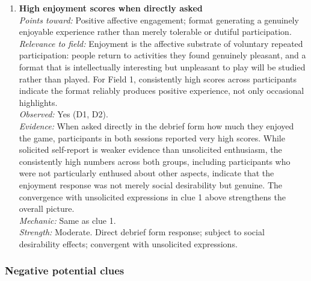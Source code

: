 \documentclass[12pt]{article}
\begin{document}
\begin{enumerate}
\item \textbf{High enjoyment scores when directly asked}\\
\textit{Points toward:} Positive affective engagement; format generating a genuinely enjoyable experience rather than merely tolerable or dutiful participation.\\
\textit{Relevance to field:} Enjoyment is the affective substrate of voluntary repeated participation: people return to activities they found genuinely pleasant, and a format that is intellectually interesting but unpleasant to play will be studied rather than played. For Field 1, consistently high scores across participants indicate the format reliably produces positive experience, not only occasional highlights.\\
\textit{Observed:} Yes (D1, D2).\\
\textit{Evidence:} When asked directly in the debrief form how much they enjoyed the game, participants in both sessions reported very high scores. While solicited self-report is weaker evidence than unsolicited enthusiasm, the consistently high numbers across both groups, including participants who were not particularly enthused about other aspects, indicate that the enjoyment response was not merely social desirability but genuine. The convergence with unsolicited expressions in clue 1 above strengthens the overall picture.\\
\textit{Mechanic:} Same as clue 1.\\
\textit{Strength:} Moderate. Direct debrief form response; subject to social desirability effects; convergent with unsolicited expressions.

\end{enumerate}

\subsubsection*{Negative potential clues}
\end{document}

